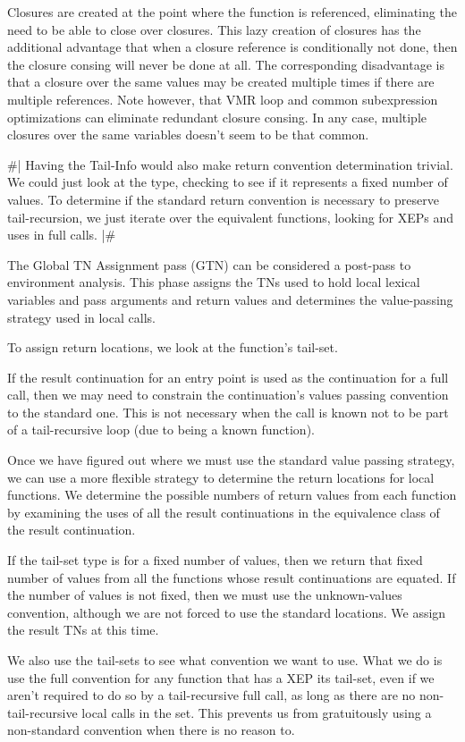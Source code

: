 Closures are created at the point where the function is referenced, eliminating
the need to be able to close over closures.  This lazy creation of closures has
the additional advantage that when a closure reference is conditionally not
done, then the closure consing will never be done at all.  The corresponding
disadvantage is that a closure over the same values may be created multiple
times if there are multiple references.  Note however, that VMR loop and common
subexpression optimizations can eliminate redundant closure consing.  In any
case, multiple closures over the same variables doesn't seem to be that common.

\#|
Having the Tail-Info would also make return convention determination trivial.
We could just look at the type, checking to see if it represents a fixed number
of values.  To determine if the standard return convention is necessary to
preserve tail-recursion, we just iterate over the equivalent functions, looking
for XEPs and uses in full calls.
|\#

The Global TN Assignment pass (GTN) can be considered a post-pass to
environment analysis.  This phase assigns the TNs used to hold local lexical
variables and pass arguments and return values and determines the value-passing
strategy used in local calls.

To assign return locations, we look at the function's tail-set.

If the result continuation for an entry point is used as the continuation for a
full call, then we may need to constrain the continuation's values passing
convention to the standard one.  This is not necessary when the call is known
not to be part of a tail-recursive loop (due to being a known function).

Once we have figured out where we must use the standard value passing strategy,
we can use a more flexible strategy to determine the return locations for local
functions.  We determine the possible numbers of return values from each
function by examining the uses of all the result continuations in the
equivalence class of the result continuation.

If the tail-set type is for a fixed number of
values, then we return that fixed number of values from all the functions whose
result continuations are equated.  If the number of values is not fixed, then
we must use the unknown-values convention, although we are not forced to use
the standard locations.  We assign the result TNs at this time.

We also use the tail-sets to see what convention we want to use.  What we do is
use the full convention for any function that has a XEP its tail-set, even if
we aren't required to do so by a tail-recursive full call, as long as there are
no non-tail-recursive local calls in the set.  This prevents us from
gratuitously using a non-standard convention when there is no reason to.

